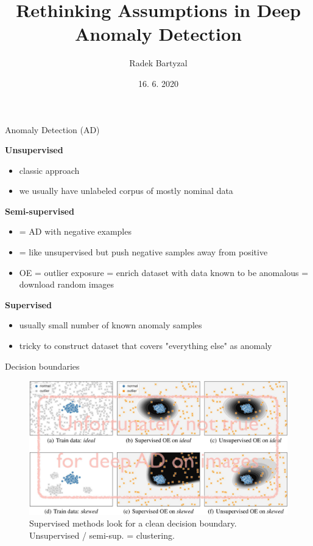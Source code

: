 \documentclass{beamer}
\begin{document}
\title[Anomaly Detection (AD)]{Rethinking Assumptions in Deep Anomaly Detection}  
\author{Radek Bartyzal}
\date{16. 6. 2020} 

\frame{\titlepage} 

\begin{frame}{Anomaly Detection (AD)}

\textbf{Unsupervised}
\begin{itemize}
\item classic approach
\item we usually have unlabeled corpus of mostly nominal data
\end{itemize}


\textbf{Semi-supervised}
\begin{itemize}
\item = AD with negative examples
\item = like unsupervised but push negative samples away from positive
\item OE = outlier exposure = enrich dataset with data known to be anomalous = download random images
\end{itemize}

\textbf{Supervised}
\begin{itemize}
\item usually small number of known anomaly samples
\item tricky to construct dataset that covers "everything else" as anomaly
\end{itemize}


\end{frame}

\begin{frame}{Decision boundaries}

\begin{figure}[h]
\includegraphics[width=\textwidth]{img/boundary}
\caption{Supervised methods look for a clean decision boundary. Unsupervised / semi-sup. = clustering.}
\end{figure}

\end{frame}
\end{document}
